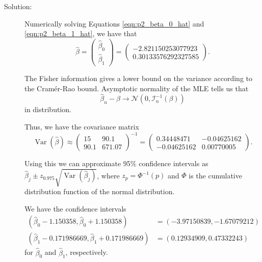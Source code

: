 \documentclass[letterpaper,11pt]{article}
\begin{document}
\begin{enumerate}
\begin{enumerate}
    \begin{description}
    \item[Solution:] Numerically solving Equations \ref{eqn:p2_beta_0_hat} and
      \ref{eqn:p2_beta_1_hat}, we have that
      \begin{equation}
        \hat{\beta} =
        \begin{pmatrix}
          \hat{\beta}_0 \\
          \hat{\beta}_1
        \end{pmatrix}
        =
        \begin{pmatrix}
          -2.821150253077923 \\
          0.30133576292327585
        \end{pmatrix}.
        \label{eqn:p2_beta_hat_mle}
      \end{equation}

      The Fisher information gives a lower bound on the variance according to
      the Cram\'er-Rao bound. Asymptotic normality of the MLE tells us that
      \begin{equation*}
        \hat{\beta}_n - \beta \rightarrow
        \mathcal{N}\left(0, \mathcal{I}_n^{-1}\left(\beta\right)\right)
      \end{equation*}
      in distribution.

      Thus, we have the covariance matrix
      \begin{equation}
        \operatorname{Var}\left(\hat{\beta}\right)
        \approx \begin{pmatrix}
          15 & 90.1 \\
          90.1 & 671.07
        \end{pmatrix}^{-1}
        = \begin{pmatrix}
          0.34448471 & -0.04625162 \\
          -0.04625162 & 0.00770005
        \end{pmatrix}.
      \end{equation}

      Using this we can approximate 95\% confidence intervals as
      $\hat{\beta}_j \pm
      z_{0.975}\sqrt{\operatorname{Var}\left(\hat{\beta}_j\right)}$, where
      $z_{p} = \Phi^{-1}\left(p\right)$ and $\Phi$ is the cumulative
      distribution function of the normal distribution.

      We have the confidence intervals
      \begin{align*}
        \left(
        \hat{\beta}_0 - 1.150358,
        \hat{\beta}_0 + 1.150358
        \right)
        &= \left(
          -3.97150839, -1.67079212
        \right)\\
        \left(
        \hat{\beta}_1 - 0.171986669,
        \hat{\beta}_1 + 0.171986669
        \right)
        &= \left(
          0.12934909, 0.47332243
          \right)
      \end{align*}
      for $\hat{\beta}_0$ and $\hat{\beta}_1$, respectively.
      


\end{description}
\end{enumerate}
\end{enumerate}
\end{document}
